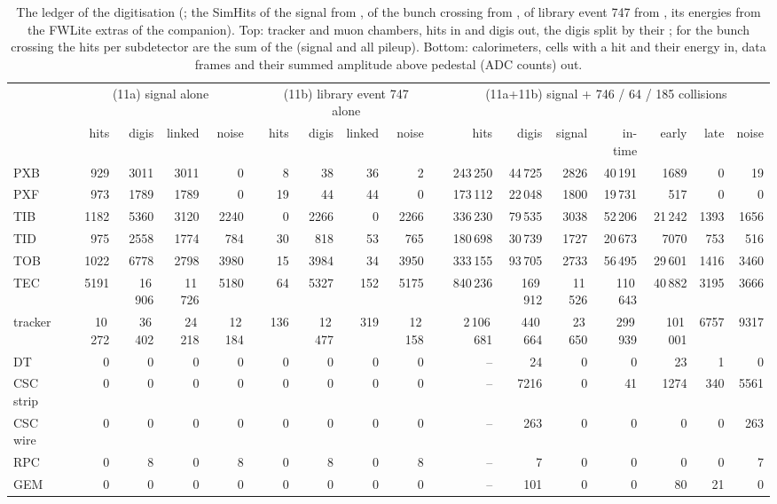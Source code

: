 \begin{table}[tb]
\centering\scriptsize\setlength{\tabcolsep}{2.0pt}
\caption{The ledger of the digitisation (; the SimHits of the signal from
, of the bunch crossing from , of library
event 747 from , its energies from the FWLite extras of the companion). Top: tracker
and muon chambers, hits in and digis
out, the digis split by their ; for the bunch crossing the hits per subdetector are the sum of the
 (signal and all pileup). Bottom: calorimeters, cells with a hit and their energy in, data frames
and their summed amplitude above pedestal (ADC counts) out.}
\label{tab:11_ledger}
\begin{tabular}{lrrrrcrrrrcrrrrrrr}
\toprule
 & \multicolumn{4}{c}{(11a) signal alone} & & \multicolumn{4}{c}{(11b) library event 747 alone} & & \multicolumn{7}{c}{(11a+11b) signal + 746 / 64 / 185 collisions} \\
\cmidrule(lr){2-5}\cmidrule(lr){7-10}\cmidrule(lr){12-18}
 & hits & digis & linked & noise & & hits & digis & linked & noise & & hits & digis & signal & in-time & early & late & noise \\
\midrule
PXB & 929 & 3011 & 3011 & 0 & & 8 & 38 & 36 & 2 & & 243\,250 & 44\,725 & 2826 & 40\,191 & 1689 & 0 & 19 \\
PXF & 973 & 1789 & 1789 & 0 & & 19 & 44 & 44 & 0 & & 173\,112 & 22\,048 & 1800 & 19\,731 & 517 & 0 & 0 \\
TIB & 1182 & 5360 & 3120 & 2240 & & 0 & 2266 & 0 & 2266 & & 336\,230 & 79\,535 & 3038 & 52\,206 & 21\,242 & 1393 & 1656 \\
TID & 975 & 2558 & 1774 & 784 & & 30 & 818 & 53 & 765 & & 180\,698 & 30\,739 & 1727 & 20\,673 & 7070 & 753 & 516 \\
TOB & 1022 & 6778 & 2798 & 3980 & & 15 & 3984 & 34 & 3950 & & 333\,155 & 93\,705 & 2733 & 56\,495 & 29\,601 & 1416 & 3460 \\
TEC & 5191 & 16\,906 & 11\,726 & 5180 & & 64 & 5327 & 152 & 5175 & & 840\,236 & 169\,912 & 11\,526 & 110\,643 & 40\,882 & 3195 & 3666 \\
\midrule
tracker & 10\,272 & 36\,402 & 24\,218 & 12\,184 & & 136 & 12\,477 & 319 & 12\,158 & & 2\,106\,681 & 440\,664 & 23\,650 & 299\,939 & 101\,001 & 6757 & 9317 \\
\midrule
DT & 0 & 0 & 0 & 0 & & 0 & 0 & 0 & 0 & & -- & 24 & 0 & 0 & 23 & 1 & 0 \\
CSC strip & 0 & 0 & 0 & 0 & & 0 & 0 & 0 & 0 & & -- & 7216 & 0 & 41 & 1274 & 340 & 5561 \\
CSC wire & 0 & 0 & 0 & 0 & & 0 & 0 & 0 & 0 & & -- & 263 & 0 & 0 & 0 & 0 & 263 \\
RPC & 0 & 8 & 0 & 8 & & 0 & 8 & 0 & 8 & & -- & 7 & 0 & 0 & 0 & 0 & 7 \\
GEM & 0 & 0 & 0 & 0 & & 0 & 0 & 0 & 0 & & -- & 101 & 0 & 0 & 80 & 21 & 0 \\
\bottomrule
\end{tabular}


\end{table}
